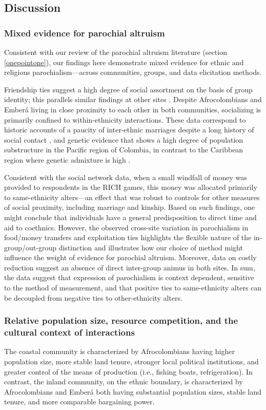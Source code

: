 \documentclass[bibauthoryear]{aa}
\begin{document}
\subsection{Discussion}
\subsubsection{Mixed evidence for parochial altruism}

Consistent with our review of the parochial altruism literature (section \ref{onepointone}), our findings here demonstrate mixed evidence for ethnic and religious parochialism---across communities, groups, and data elicitation methods.

Friendship ties suggest a high degree of social assortment on the basis of group identity; this parallels similar findings at other sites \cite[e.g.,][]{power2017social, baerveldt2007ethnic}. Despite Afrocolombians and Ember\'a living in close proximity to each other in both communities, socializing is primarily confined to within-ethnicity interactions. These data correspond to historic accounts of a paucity of inter-ethnic marriages despite a long history of social contact \citep{Cay73}, and genetic evidence that shows a high degree of population substructure in the Pacific region of Colombia, in contrast to the Caribbean region where genetic admixture is high \citep{ossa2016outlining}.

Consistent with the social network data, when a small windfall of money was provided to respondents in the RICH games, this money was allocated primarily to same-ethnicity alters---an effect that was robust to controls for other measures of social proximity, including marriage and kinship. Based on such findings, one might conclude that individuals have a general predisposition to direct time and aid to coethnics.  However, the observed cross-site variation in parochialism in food/money transfers and exploitation ties highlights the flexible nature of the in-group/out-group distinction and illustrates how our choice of method might influence the weight of evidence for parochial altruism. Moreover, data on costly reduction suggest an absence of direct inter-group animus in both sites. In sum, the data suggest that expression of parochialism is context dependent, sensitive to the method of measurement, and that positive ties to same-ethnicity alters can be decoupled from negative ties to other-ethnicity alters.

\subsubsection{Relative population size, resource competition, and the cultural context of interactions}
\label{contextcc}
The coastal community is characterized by Afrocolombians having higher population size, more stable land tenure,  stronger local political institutions, and greater control of the means of production (i.e., fishing boats, refrigeration). In contrast, the inland community, on the ethnic boundary, is characterized by Afrocolombians and Ember\'a both having substantial population sizes, stable land tenure, and more comparable bargaining power. 
\end{document}
